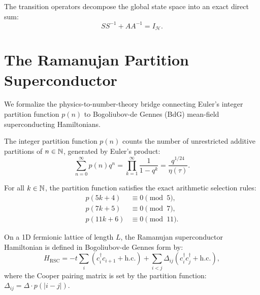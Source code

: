 \begin{theorem}
\label{thm:resolution_of_identity}
\leanok
The transition operators decompose the global state space into an exact direct sum:
\[
S S^{-1} + A A^{-1} = I_{\mathcal{H}}.
\]
\end{theorem}

\section{The Ramanujan Partition Superconductor}

We formalize the physics-to-number-theory bridge connecting Euler's integer partition function $p(n)$ to Bogoliubov-de Gennes (BdG) mean-field superconducting Hamiltonians.

\begin{definition}
\label{def:partition_function}
The integer partition function $p(n)$ counts the number of unrestricted additive partitions of $n \in \mathbb{N}$, generated by Euler's product:
\[
\sum_{n=0}^\infty p(n) q^n = \prod_{k=1}^\infty \frac{1}{1 - q^k} = \frac{q^{1/24}}{\eta(\tau)}.
\]
\end{definition}

\begin{theorem}
\label{thm:ramanujan_partition_congruences}
For all $k \in \mathbb{N}$, the partition function satisfies the exact arithmetic selection rules:
\begin{align*}
p(5k + 4) &\equiv 0 \pmod 5, \\
p(7k + 5) &\equiv 0 \pmod 7, \\
p(11k + 6) &\equiv 0 \pmod{11}.
\end{align*}
\end{theorem}

\begin{definition}
\label{def:ramanujan_bdg_hamiltonian}
On a 1D fermionic lattice of length $L$, the Ramanujan superconductor Hamiltonian is defined in Bogoliubov-de Gennes form by:
\[
H_{\mathrm{RSC}} = -t \sum_{i} \left( c_i^\dagger c_{i+1} + \mathrm{h.c.} \right) + \sum_{i < j} \Delta_{ij} \left( c_i^\dagger c_j^\dagger + \mathrm{h.c.} \right),
\]
where the Cooper pairing matrix is set by the partition function: $\Delta_{ij} = \Delta \cdot p(|i - j|)$.
\end{definition}

